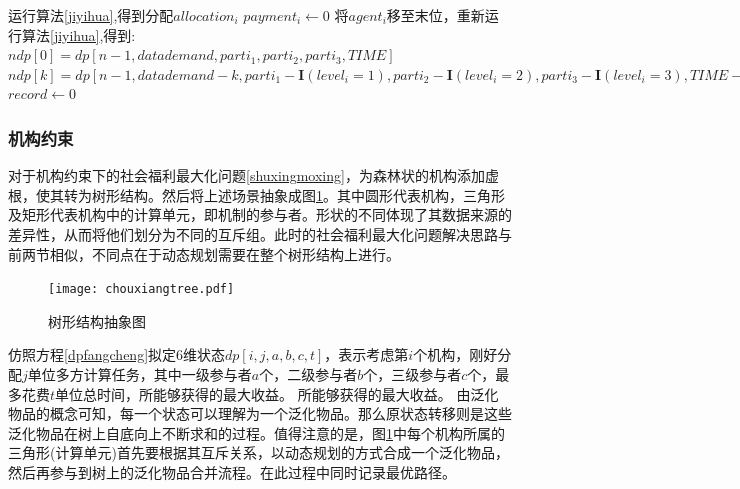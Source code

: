 \documentclass[promaster]{thesis-uestc}
\begin{document}

\begin{algorithm}[h]
    运行算法\ref{jiyihua},得到分配$allocation_i$\;
    {
        $payment_i \leftarrow 0$\;
        将$agent_i$移至末位，重新运行算法\ref{jiyihua},得到:\;
        $ndp[0] = dp[n-1,datademand,parti_1,parti_2,parti_3,TIME]$\;
        $ndp[k] = dp[n-1,datademand-k,parti_1-\mathbf{I}(level_i=1),parti_2-\mathbf{I}(level_i=2),parti_3-\mathbf{I}(level_i=3),TIME-k*timeperunit_i-transmitcost_i],1\leq k\leq datacount_i$\;
        $record \leftarrow 0$\;
    }
\caption{指标集约束问题的价格算法}
\label{dp_zhifu}
\end{algorithm}


\FloatBarrier

\subsubsection{机构约束}
对于机构约束下的社会福利最大化问题\ref{shuxingmoxing}，为森林状的机构添加虚根，使其转为树形结构。然后将上述场景抽象成图\ref{chouxiangtree}。其中圆形代表机构，三角形及矩形代表机构中的计算单元，即机制的参与者。形状的不同体现了其数据来源的差异性，从而将他们划分为不同的互斥组。此时的社会福利最大化问题解决思路与前两节相似，不同点在于动态规划需要在整个树形结构上进行。

\begin{figure}[h]
    \texttt{[image: chouxiangtree.pdf]}
    \caption{树形结构抽象图}
    \label{chouxiangtree}
\end{figure}

仿照方程\ref{dpfangcheng}拟定6维状态$dp[i,j,a,b,c,t]$，表示考虑第$i$个机构，刚好分配$j$单位多方计算任务，其中一级参与者$a$个，二级参与者$b$个，三级参与者$c$个，最多花费$t$单位总时间，所能够获得的最大收益。
所能够获得的最大收益。
由泛化物品的概念可知，每一个状态可以理解为一个泛化物品。那么原状态转移则是这些泛化物品在树上自底向上不断求和的过程。值得注意的是，图\ref{chouxiangtree}中每个机构所属的三角形(计算单元)首先要根据其互斥关系，以动态规划的方式合成一个泛化物品，然后再参与到树上的泛化物品合并流程。在此过程中同时记录最优路径。
\end{document}
